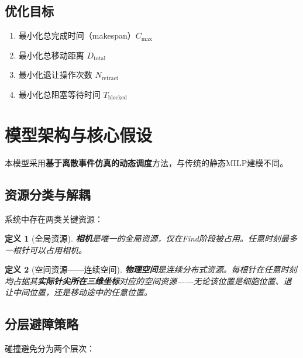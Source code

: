 \documentclass[11pt,a4paper]{article}
\newtheorem{definition}{定义}[section]
\begin{document}
\subsection{优化目标}
\begin{enumerate}
    \item 最小化总完成时间（makespan）$C_{\max}$
    \item 最小化总移动距离 $D_{\text{total}}$
    \item 最小化退让操作次数 $N_{\text{retract}}$
    \item 最小化总阻塞等待时间 $T_{\text{blocked}}$
\end{enumerate}

\section{模型架构与核心假设}

本模型采用\textbf{基于离散事件仿真的动态调度}方法，与传统的静态MILP建模不同。

\subsection{资源分类与解耦}

系统中存在两类关键资源：

\begin{definition}[全局资源]
\textbf{相机}是唯一的全局资源，仅在Find阶段被占用。任意时刻最多一根针可以占用相机。
\end{definition}

\begin{definition}[空间资源——连续空间]
\textbf{物理空间}是连续分布式资源。每根针在任意时刻均占据其\textbf{实际针尖所在三维坐标}对应的空间资源——无论该位置是细胞位置、退让中间位置，还是移动途中的任意位置。
\end{definition}

\subsection{分层避障策略}

碰撞避免分为两个层次：
\end{document}
